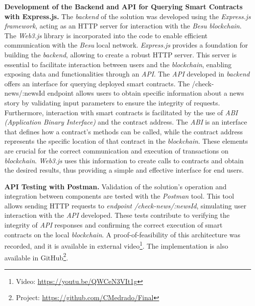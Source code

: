 
\noindent\textbf{Development of the Backend and API for Querying Smart Contracts with Express.js.} The \textit{backend} of the solution was developed using the \textit{Express.js framework}, acting as an HTTP server for interaction with the \textit{Besu blockchain}. The \textit{Web3.js} library is incorporated into the code to enable efficient communication with the \textit{Besu} local network. \textit{Express.js} provides a foundation for building the \textit{backend}, allowing  to create a robust HTTP server. This server is essential to facilitate interaction between users and the \textit{blockchain}, enabling exposing data and functionalities through an \textit{API}. The \textit{API} developed in \textit{backend} offers an interface for querying deployed smart contracts. The /check-news/:newsId endpoint allows users to obtain specific information about a news story by validating input parameters to ensure the integrity of requests.
Furthermore, interaction with smart contracts is facilitated by the use of \textit{ABI (Application Binary Interface)} and the contract address. The \textit{ABI} is an interface that defines how a contract's methods can be called, while the contract address represents the specific location of that contract in the \textit{blockchain}. These elements are crucial for the correct communication and execution of transactions on \textit{blockchain}. \textit{Web3.js} uses this information to create calls to contracts and obtain the desired results, thus providing a simple and effective interface for end users.




\noindent\textbf{API Testing with Postman.} Validation of the solution's operation and integration between components are tested with the \textit{Postman} tool. This tool allows sending HTTP requests to \textit{endpoint /check-news/:newsId}, simulating user interaction with the \textit{API} developed. These tests contribute to verifying the integrity of \textit{API} responses and confirming the correct execution of smart contracts on the local \textit{blockchain}. A proof-of-feasibility of this architecture was recorded, and it is available in external video\footnote{Video: \url{https://youtu.be/QWCeN3VIt1g}}. The implementation is also available in GitHub\footnote{Project: \url{https://github.com/CMedrado/Final}}.

